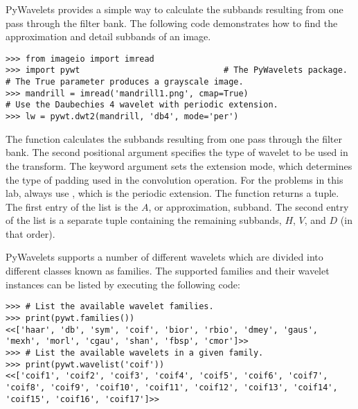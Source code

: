 PyWavelets provides a simple way to calculate the subbands resulting from one pass through the filter bank.
The following code demonstrates how to find the approximation and detail subbands of an image.

\begin{lstlisting}
>>> from imageio import imread
>>> import pywt                             # The PyWavelets package.
# The True parameter produces a grayscale image.
>>> mandrill = imread('mandrill1.png', cmap=True)
# Use the Daubechies 4 wavelet with periodic extension.
>>> lw = pywt.dwt2(mandrill, 'db4', mode='per')
\end{lstlisting}

The function  calculates the subbands resulting from one pass through the filter bank.
The second positional argument specifies the type of wavelet to be used in the transform.
The  keyword argument sets the extension mode, which determines the type of padding used in the convolution operation.
For the problems in this lab, always use , which is the periodic extension.
The function  returns a tuple.
The first entry of the list is the $A$, or approximation, subband.
The second entry of the list is a separate tuple containing the remaining subbands, $H$, $V$, and $D$ (in that order).
\begin{comment}
These subbands can be plotted as follows:

\begin{lstlisting}
>>> plt.subplot(221)
>>> plt.imshow(lw[0], cmap='gray')
>>> plt.axis('off')
>>> plt.subplot(222)
# The absolute value of the detail subbands is plotted to highlight contrast.
>>> plt.imshow(np.abs(lw[1][0]), cmap='gray')
>>> plt.axis('off')
>>> plt.subplot(223)
>>> plt.imshow(np.abs(lw[1][1]), cmap='gray')
>>> plt.axis('off')
>>> plt.subplot(224)
>>> plt.imshow(np.abs(lw[1][2]), cmap='gray')
>>> plt.axis('off')
>>> plt.subplots_adjust(wspace=0, hspace=0)      # Remove space between plots.
\end{lstlisting}
\end{comment}

PyWavelets supports a number of different wavelets which are divided into different classes known as families.
The supported families and their wavelet instances can be listed by executing the following code:

\begin{lstlisting}
>>> # List the available wavelet families.
>>> print(pywt.families())
<<['haar', 'db', 'sym', 'coif', 'bior', 'rbio', 'dmey', 'gaus', 'mexh', 'morl', 'cgau', 'shan', 'fbsp', 'cmor']>>
>>> # List the available wavelets in a given family.
>>> print(pywt.wavelist('coif'))
<<['coif1', 'coif2', 'coif3', 'coif4', 'coif5', 'coif6', 'coif7', 'coif8', 'coif9', 'coif10', 'coif11', 'coif12', 'coif13', 'coif14', 'coif15', 'coif16', 'coif17']>>
\end{lstlisting}

